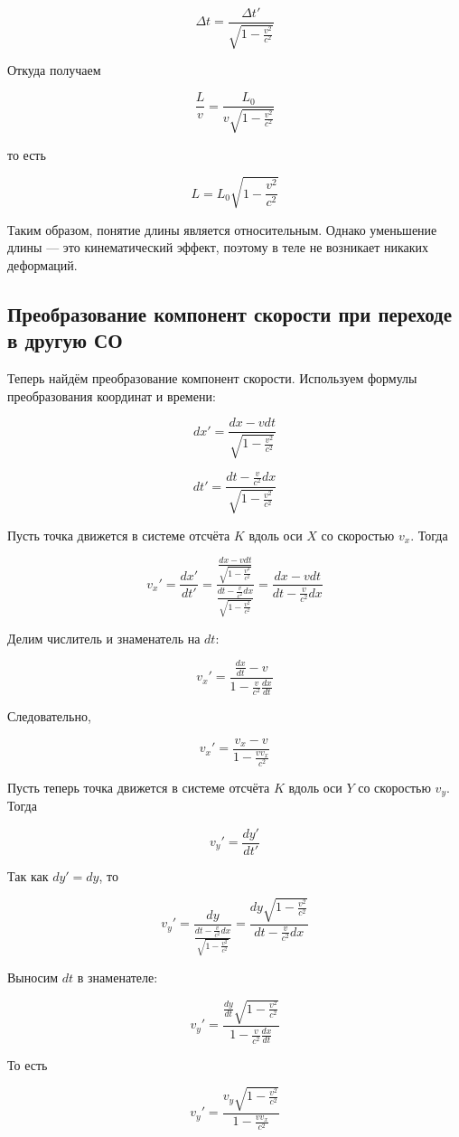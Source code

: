 \documentclass[a4paper,12pt]{article}
\begin{document}
\[
\Delta t
=
\frac{\Delta t'}{\sqrt{1 - \frac{v^2}{c^2}}}
\]

Откуда получаем

\[
\frac{L}{v}
=
\frac{L_0}{v \sqrt{1 - \frac{v^2}{c^2}}}
\]

то есть

\[
L = L_0 \sqrt{1 - \frac{v^2}{c^2}}
\]

Таким образом, понятие длины является относительным. Однако уменьшение длины — это кинематический эффект, поэтому в теле не возникает никаких деформаций.


\subsection*{Преобразование компонент скорости при переходе в другую СО}
Теперь найдём преобразование компонент скорости. Используем формулы преобразования координат и времени:

\[
dx' =
\frac{dx - vdt}{\sqrt{1 - \frac{v^2}{c^2}}}
\]

\[
dt' =
\frac{dt - \frac{v}{c^2} dx}{\sqrt{1 - \frac{v^2}{c^2}}}
\]

Пусть точка движется в системе отсчёта \(K\) вдоль оси \(X\) со скоростью \(v_x\). Тогда

\[
v_x' =
\frac{dx'}{dt'}
=
\frac{
\frac{dx - vdt}{\sqrt{1 - \frac{v^2}{c^2}}}
}{
\frac{dt - \frac{v}{c^2} dx}{\sqrt{1 - \frac{v^2}{c^2}}}
}
=
\frac{dx - vdt}{dt - \frac{v}{c^2} dx}
\]

Делим числитель и знаменатель на \(dt\):

\[
v_x' =
\frac{ \frac{dx}{dt} - v}{1 - \frac{v}{c^2} \frac{dx}{dt}}
\]

Следовательно,

\[
v_x' =
\frac{v_x - v}{1 - \frac{v v_x}{c^2}}
\]

Пусть теперь точка движется в системе отсчёта \(K\) вдоль оси \(Y\) со скоростью \(v_y\). Тогда

\[
v_y' =
\frac{dy'}{dt'}
\]

Так как \(dy' = dy\), то

\[
v_y' =
\frac{
dy
}{
\frac{dt - \frac{v}{c^2} dx}{\sqrt{1 - \frac{v^2}{c^2}}}
}
=
\frac{dy \sqrt{1 - \frac{v^2}{c^2}}}{dt - \frac{v}{c^2} dx}
\]

Выносим \(dt\) в знаменателе:

\[
v_y' =
\frac{
\frac{dy}{dt} \sqrt{1 - \frac{v^2}{c^2}}
}{
1 - \frac{v}{c^2} \frac{dx}{dt}
}
\]

То есть

\[
v_y' =
\frac{
v_y \sqrt{1 - \frac{v^2}{c^2}}
}{
1 - \frac{v v_x}{c^2}
}
\]
\end{document}
